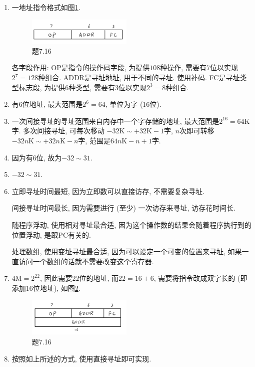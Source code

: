 \documentclass[UTF8]{report}
\newenvironment{solution}{{\noindent\hskip 2em \bf 解 \quad}}{}
\begin{document}
\begin{solution}
    \begin{enumerate}

        \item 一地址指令格式如图\ref{fig:7_16}.
        \begin{figure}[!htbp]
            \centering
            \includegraphics[width=5cm]{fig/7.16.png}
            \caption{题7.16}
            \label{fig:7_16}
        \end{figure}
        各字段作用: OP是指令的操作码字段, 为提供$108$种操作, 需要有$7$位以实现$2^7=128$种组合.
        ADDR是寻址地址, 用于不同的寻址. 使用补码.
        FC是寻址类型标志段, 为提供$6$种类型, 需要有$3$位以实现$2^3=8$种组合.

        \item 有$6$位地址, 最大范围是$2^6 = 64$, 单位为字 (16位).

        \item 一次间接寻址的寻址范围来自内存中一个字存储的地址, 最大范围是$2^{16} = 64\mathrm{K}$字. 多次间接寻址, 可每次移动 $-32\mathrm{K} \sim +32\mathrm{K} - 1$字, $n$次即可转移 $-32n\mathrm{K} \sim +32n\mathrm{K} - n$字, 范围是$64n\mathrm{K}-n+1$字.

        \item 因为有$6$位, 故为$-32 \sim 31$.

        \item $-32 \sim 31$.

        \item 立即寻址时间最短, 因为立即数可以直接访存, 不需要复杂寻址.
        
        间接寻址时间最长, 因为需要进行 (至少) 一次访存来寻址, 访存花时间长.
        
        随程序浮动, 使用相对寻址最合适, 因为这个操作数的结果会随着程序执行到的位置浮动, 是跟PC有关的.

        处理数组, 使用变址寻址最合适, 因为可以设定一个可变的位置来寻址, 如果一直访问一个数组的话就不需要改变这个寄存器.

        \item $4\mathrm{M} = 2^{22}$, 因此需要$22$位的地址, 而$22=16+6$, 需要将指令改成双字长的 (即添加16位地址), 如图\ref{fig:7_16_2}.
        \begin{figure}[!htbp]
            \centering
            \includegraphics[width=5cm]{fig/7.16_2.png}
            \caption{题7.16}
            \label{fig:7_16_2}
        \end{figure}

        \item 按照如上所述的方式, 使用直接寻址即可实现. 
        \end{enumerate}
\end{solution}
\end{document}
